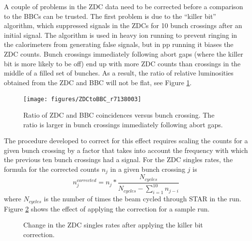A couple of problems in the ZDC data need to be corrected before a comparison
to the BBCs can be trusted. The first problem is due to the ``killer bit''
algorithm, which suppressed signals in the ZDCs for 10 bunch crossings after
an initial signal. The algorithm is used in heavy ion running to prevent
ringing in the calorimeters from generating false signals, but in pp running
it biases the ZDC counts. Bunch crossings immediately following abort gaps
(where the killer bit is more likely to be off) end up with more ZDC counts
than crossings in the middle of a filled set of bunches. As a result, the
ratio of relative luminosities obtained from the ZDC and BBC will not be flat,
see Figure \ref{fig:zdctobbc6170012zoom}.

\begin{figure}
  \texttt{[image: figures/ZDCtoBBC\_r7138003]}
  \caption{Ratio of ZDC and BBC coincidences versus bunch crossing.  The ratio is larger in bunch crossings immediately following abort gaps.}
  \label{fig:zdctobbc6170012zoom}
\end{figure}

The procedure developed to correct for this effect requires scaling the counts
for a given bunch crossing by a factor that takes into account the frequency
with which the previous ten bunch crossings had a signal. For the ZDC singles
rates, the formula for the corrected counts $n_{j}$ in a given bunch crossing
$j$ is
%
\begin{equation}
  n_{j}^{corrected} = n_{j} * \frac{N_{cycles}}{N_{cycles} - \sum_{i=1}^{10}n_{j-i}}
\end{equation}
%
where $N_{cycles}$ is the number of times the beam cycled through STAR in the
run. Figure \ref{fig:zdc-singles-ratio} shows the effect of applying the
correction for a sample run.

\begin{figure}
  \caption{Change in the ZDC singles rates after applying the killer bit correction.}
  \label{fig:zdc-singles-ratio}
\end{figure}

